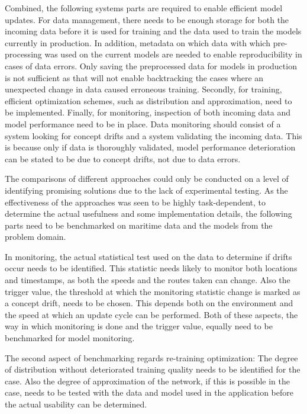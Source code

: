 Combined, the following systems parts are required to enable efficient model updates. For data management, there needs to be enough storage for both the incoming data before it is used for training and the data used to train the models currently in production. In addition, metadata on which data with which pre-processing was used on the current models are needed to enable reproducibility in cases of data errors. Only saving the preprocessed data for models in production is not sufficient as that will not enable backtracking the cases where an unexpected change in data caused erroneous training. Secondly, for training, efficient optimization schemes, such as distribution and approximation, need to be implemented. Finally, for monitoring, inspection of both incoming data and model performance need to be in place. Data monitoring should consist of a system looking for concept drifts and a system validating the incoming data. This is because only if data is thoroughly validated, model performance deterioration can be stated to be due to concept drifts, not due to data errors.

The comparisons of different approaches could only be conducted on a level of identifying promising solutions due to the lack of experimental testing. As the effectiveness of the approaches was seen to be highly task-dependent, to determine the actual usefulness and some implementation details, the following parts need to be benchmarked on maritime data and the models from the problem domain.

In monitoring, the actual statistical test used on the data to determine if drifts occur needs to be identified. This statistic needs likely to monitor both locations and timestamps, as both the speeds and the routes taken can change. Also the trigger value, the threshold at which the monitoring statistic change is marked as a concept drift, needs to be chosen. This depends both on the environment and the speed at which an update cycle can be performed. Both of these aspects, the way in which monitoring is done and the trigger value, equally need to be benchmarked for model monitoring.

The second aspect of benchmarking regards re-training optimization: The degree of distribution without deteriorated training quality needs to be identified for the case. Also the degree of approximation of the network, if this is possible in the case, needs to be tested with the data and model used in the application before the actual usability can be determined.

